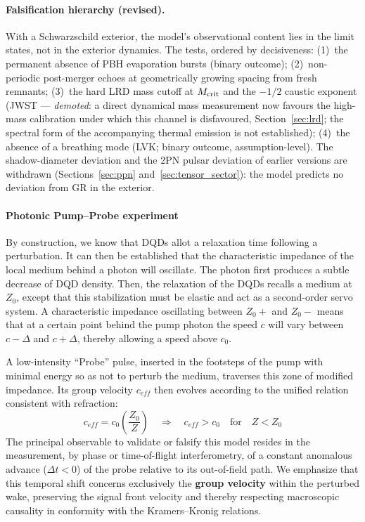 \documentclass[11pt,a4paper]{article}
\theoremstyle{plain}
\theoremstyle{remark}
\begin{document}
\paragraph{Falsification hierarchy (revised).} With a Schwarzschild exterior, the model's observational content lies in the limit states, not in the exterior dynamics. The tests, ordered by decisiveness: (1)~the permanent absence of PBH evaporation bursts (binary outcome); (2)~non-periodic post-merger echoes at geometrically growing spacing from fresh remnants; (3)~the hard LRD mass cutoff at $M_{\rm crit}$ and the $-1/2$ caustic exponent (JWST --- \emph{demoted}: a direct dynamical mass measurement now favours the high-mass calibration under which this channel is disfavoured, Section~\ref{sec:lrd}; the spectral form of the accompanying thermal emission is not established); (4)~the absence of a breathing mode (LVK; binary outcome, assumption-level). The shadow-diameter deviation and the 2PN pulsar deviation of earlier versions are withdrawn (Sections~\ref{sec:ppn} and~\ref{sec:tensor_sector}): the model predicts no deviation from GR in the exterior.

\paragraph{Photonic Pump--Probe experiment}
By construction, we know that DQDs allot a relaxation time following a perturbation. It can then be established that the characteristic impedance of the local medium behind a photon will oscillate. The photon first produces a subtle decrease of DQD density. Then, the relaxation of the DQDs recalls a medium at $Z_0$, except that this stabilization must be elastic and act as a second-order servo system. A characteristic impedance oscillating between $Z_0+$ and $Z_0-$ means that at a certain point behind the pump photon the speed $c$ will vary between $c-\Delta$ and $c+\Delta$, thereby allowing a speed above $c_0$.

A low-intensity ``Probe'' pulse, inserted in the footsteps of the pump with minimal energy so as not to perturb the medium, traverses this zone of modified impedance. Its group velocity $c_{eff}$ then evolves according to the unified relation consistent with refraction:
\begin{equation}
c_{eff} = c_{0}\left(\frac{Z_{0}}{Z}\right) \quad \Rightarrow \quad c_{eff} > c_{0} \quad \text{for} \quad Z < Z_{0}
\end{equation}
The principal observable to validate or falsify this model resides in the measurement, by phase or time-of-flight interferometry, of a constant anomalous advance ($\Delta t < 0$) of the probe relative to its out-of-field path. We emphasize that this temporal shift concerns exclusively the \textbf{group velocity} within the perturbed wake, preserving the signal front velocity and thereby respecting macroscopic causality in conformity with the Kramers--Kronig relations.
\end{document}
